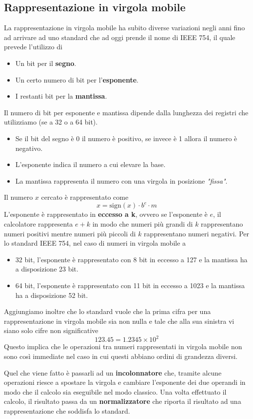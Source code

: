 \subsection{Rappresentazione in virgola mobile}
La rappresentazione in virgola mobile ha subito diverse variazioni negli anni fino ad arrivare ad
uno standard che ad oggi prende il nome di IEEE 754, il quale prevede l'utilizzo di
\begin{itemize}
	\item Un bit per il \textbf{segno}.
	\item Un certo numero di bit per l'\textbf{esponente}.
	\item I restanti bit per la \textbf{mantissa}.
\end{itemize}
Il numero di bit per esponente e mantissa dipende dalla lunghezza dei registri che utilizziamo (se
a 32 o a 64 bit).
\begin{itemize}
	\item Se il bit del segno è 0 il numero è positivo, se invece è 1 allora il numero è negativo.
	\item L'esponente indica il numero a cui elevare la base.
	\item La mantissa rappresenta il numero con una virgola in posizione \emph{"fissa"}.
\end{itemize}
Il numero $x$ cercato è rappresentato come
\[ x = \text{sign}(x) \cdot b^e \cdot m \]
L'esponente è rappresentato in \textbf{eccesso a k}, ovvero se l'esponente è $e$, il calcolatore
rappresenta $e+k$ in modo che numeri più grandi di $k$ rappresentano numeri positivi mentre numeri
più piccoli di $k$ rappresentano numeri negativi. Per lo standard IEEE 754, nel caso di numeri in
virgola mobile a
\begin{itemize}
	\item 32 bit, l'esponente è rappresentato con 8 bit in eccesso a 127 e la mantissa ha a
	      disposizione 23 bit.
	\item 64 bit, l'esponente è rappresentato con 11 bit in eccesso a 1023 e la mantissa ha a
	      disposizione 52 bit.
\end{itemize}
Aggiungiamo inoltre che lo standard vuole che la prima cifra per una rappresentazione in virgola
mobile sia non nulla e tale che alla sua sinistra vi siano solo cifre non significative
\[ 123.45 = 1.2345 \times 10^2 \]
Questo implica che le operazioni tra numeri rappresentati in virgola mobile non sono così immediate
nel caso in cui questi abbiano ordini di grandezza diversi.

Quel che viene fatto è passarli ad un \textbf{incolonnatore} che, tramite alcune operazioni riesce
a spostare la virgola e cambiare l'esponente dei due operandi in modo che il calcolo sia eseguibile
nel modo classico. Una volta effettuato il calcolo, il risultato passa da un \textbf{normalizzatore}
che riporta il risultato ad una rappresentazione che soddisfa lo standard.

